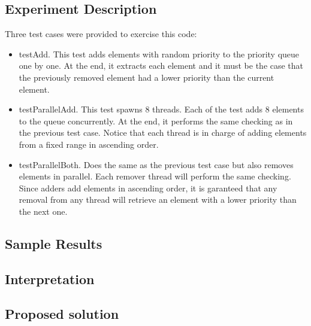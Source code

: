\subsection{Experiment Description}
\par
Three test cases were provided to exercise this code:
\begin{itemize}
\item testAdd. This test adds elements with random priority to the priority
queue one by one. At the end, it extracts each element and it must be the case
that the previously removed element had a lower priority than the current
element. 
\item testParallelAdd. This test spawns 8 threads. Each of the test adds 8
elements to the queue concurrently. At the end, it performs the same checking as
in the previous test case. Notice that each thread is in charge of adding
elements from a fixed range in ascending order.
\item testParallelBoth. Does the same as the previous test case but also removes
elements in parallel. Each remover thread will perform the same checking. Since
adders add elements in ascending order, it is garanteed that any removal from
any thread will retrieve an element with a lower priority than the next one.
\end{itemize}
\par
\subsection{Sample Results}
\par
\par
\subsection{Interpretation}
\par
\par
\subsection{Proposed solution}
\par
\par
